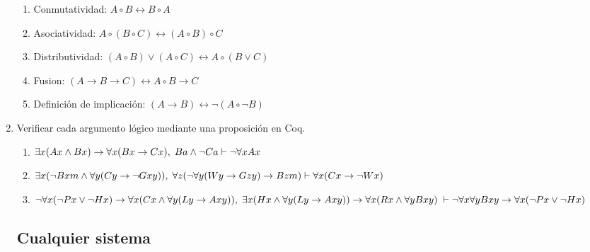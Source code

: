 \documentclass[letterpaper, 11 pt]{article}
\begin{document}
\begin{enumerate}
\begin{enumerate}
  \item Conmutatividad: 
  $A\circ B \leftrightarrow B\circ A$
  \item Asociatividad: 
  $A\circ (B\circ C) \leftrightarrow (A\circ B)\circ C$
  \item Distributividad: 
  $(A\circ B)\lor (A\circ C) \leftrightarrow A\circ (B\lor C)$
  \item Fusion: 
  $(A\to B\to C) \leftrightarrow A\circ B \to C$ 
  \item Definición de implicación: 
  $(A\to B)\leftrightarrow \neg (A\circ \neg B)$
\end{enumerate}

\item  Verificar cada
  argumento lógico mediante una proposición en Coq.  
  \begin{enumerate}
  \item $\exists x(Ax \land Bx)\to\forall x(Bx\to Cx),\; Ba\land\neg Ca \vdash \neg\forall
    x A x$
    \item $\exists x(\neg Bxm\land \forall y(Cy\to\neg Gxy)),\;
         \forall z(\neg\forall y(Wy\to Gzy)\to Bzm)\vdash \forall x(Cx\to\neg Wx)$
  \item $\neg\forall x(\neg Px\lor \neg Hx)\to \forall x(Cx \land \forall y(Ly\to Axy)),\;
         \exists x(Hx \land \forall y(Ly\to Axy))\to \forall x(Rx \land \forall yBxy)\;\vdash
         \neg\forall x\forall yBxy\to \forall x(\neg Px\lor \neg Hx)$
  \end{enumerate}
    
\subsection*{Cualquier sistema}


\end{enumerate}
\end{document}
